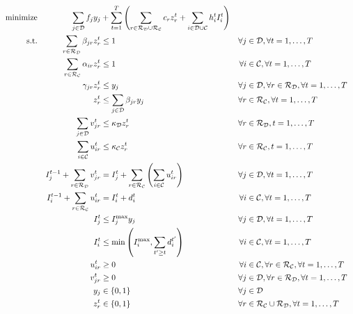 \documentclass[10pt, a4paper]{article}
\begin{document}
\begin{alignat}{3}
    \text{minimize} &&\sum_{j\in \mathcal{D}} f_j y_j &+\sum_{t=1}^{T} \left( \sum_{r\in \mathcal{R_D}\cup\mathcal{R_C}} c_r z^t_r + \sum_{i\in \mathcal{D}\cup\mathcal{C}} h^t_i I_i^t\right)\label{objfunct}\\ 
    \text{s.t.}  &&\sum_{r\in \mathcal{R_D}} \beta_{jr} z^t_r &\leq 1 															&\forall j&\in \mathcal{D}, \forall t=1,\ldots,T  \label{const:singleroutedepots}\\
                 &&\sum_{r\in \mathcal{R_C}} \alpha_{ir} z^t_r &\leq 1 															&\forall i&\in \mathcal{C}, \forall t=1,\ldots,T  \label{const:singleroutecustomers}\\
                 &&\gamma_{jr}z^t_r 					&\leq y_j 													&\forall j&\in\mathcal{D}, \forall r\in \mathcal{R_D}, \forall t=1,\ldots,T\label{const:serveopendepots}\\
                 &&z^t_r 					&\leq \sum_{j\in\mathcal{D}}\beta_{jr}y_j 													&\forall r&\in \mathcal{R_C}, \forall t=1,\ldots,T\label{const:startfromopendepots}\\
                 &&\sum_{j\in \mathcal{D}} v^t_{jr}   		&\leq \kappa_{\mathcal{D}} z^t_r 														&\forall r&\in \mathcal{R_D}, t=1,\ldots,T\label{const:deliveryUBdepots}\\
                 &&\sum_{i\in \mathcal{C}} u^t_{ir}   		&\leq \kappa_{\mathcal{C}} z^t_r 														&\forall r&\in \mathcal{R_C}, t=1,\ldots,T\label{const:deliveryUBcustomers}\\
                 &&I^{t-1}_j + \sum_{r\in\mathcal{R_D}} v^t_{jr}   			&=I^t_j +\sum_{r\in \mathcal{R_C}}\left(\sum_{i\in \mathcal{C}}u^t_{ir}\right) 			&\forall j&\in \mathcal{D}, \forall t=1,\ldots,T \label{const:invflowdepots}\\
                 &&I^{t-1}_i+\sum_{r\in \mathcal{R_C}} u^t_{ir} &= I^t_i +d^t_i 							&\forall i&\in \mathcal{C}, \forall t=1,\ldots,T\label{const:invflowcustomers}\\
                 &&I^t_j					& \leq I_j^{\max} y_j  														&\forall j&\in \mathcal{D},\forall t=1,\ldots,T\label{const:invdepotUB}\\	
                 &&I^t_i 					&\leq \min\left(I_i^{\max}, \sum_{t'\geq t}d^{t'}_i\right)											&\forall i&\in \mathcal{C}, \forall t=1,\ldots,T\label{const:invcustUB}\\
                 &&u^t_{ir}			&\geq 0 															&\forall i &\in \mathcal{C}, \forall r\in \mathcal{R_C},\forall t=1,\ldots, T\label{const:upos}	\\
                 &&v^t_{jr}			&\geq 0 															&\forall j &\in \mathcal{D}, \forall r\in \mathcal{R_D},\forall t=1,\ldots, T\label{const:vpos}	\\
                 &&y_{j}					& \in \{0,1\} 														&\forall j&\in \mathcal{D}\label{const:ybool}\\	
                 &&z^t_r					&\in \{0,1\} 														&\forall r&\in \mathcal{R_C}\cup\mathcal{R_D}, \forall t=1,\ldots,T\label{const:zbool}
\end{alignat}
\end{document}
